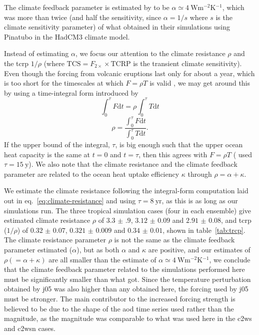 \documentclass{ametsocV6.1}
\begin{document}

The climate feedback parameter is estimated by \citet{jones2005} to be \(\alpha \simeq
\SI{4}{\watt\metre^{-2}\kelvin^{-1}}\), which was more than twice (and half the
sensitivity, since \(\alpha =1/s\) where \(s\) is the climate sensitivity parameter) of
what \citet{gregory2016} obtained in their simulations using Pinatubo in the HadCM3
climate model.

Instead of estimating \(\alpha \), we focus our attention to the climate resistance
\(\rho \) and the \gls{tcrp} \(1/\rho\) (where \(\mathrm{TCS}=F_{2\times}\times
\mathrm{TCRP}\) is the transient climate sensitivity). Even though the forcing from
volcanic eruptions last only for about a year, which is too short for the timescales at
which \(F=\rho T\) is valid \citep{gregory2016}, we may get around this by using a
time-integral form introduced by \citet{merlis2014}
\begin{equation}
  \int_0^{\tau}F \mathrm{d}t=\rho\int_{0}^{\tau}T \mathrm{d}t
\end{equation}
\begin{equation}
  \rho=\frac{\int_0^{\tau}F \mathrm{d}t}{\int_{0}^{\tau}T \mathrm{d}t}.
  \label{eq:climate-resistance}
\end{equation}
%
If the upper bound of the integral, \(\tau \), is big enough such that the upper ocean
heat capacity is the same at \(t=0\) and \(t=\tau \), then this agrees with \(F=\rho T\)
\citep{gregory2016} (\citet{merlis2014} used \(\tau =\SI{15}{\mathrm{y}}\)). We also
note that the climate resistance and the climate feedback parameter are related to the
ocean heat uptake efficiency \(\kappa \) through \(\rho =\alpha +\kappa \).

We estimate the climate resistance following the integral-form computation laid out in
eq.~\ref{eq:climate-resistance} and using \(\tau =\SI{8}{\mathrm{yr}}\), as this is as
long as our simulations run. The three tropical simulation cases (four in each ensemble)
give estimated climate resistance \(\rho \) of \(\num{3.3(9)}\), \(\num{3.12(9)}\) and
\(\num{2.91(8)}\), and \gls{tcrp} (\(1/\rho\)) of \(\num{0.32(7)}\), \(\num{0.321(9)}\)
and \(\num{0.34(1)}\), shown in table~\ref{tab:trcp}. The climate resistance parameter
\(\rho\) is not the same as the climate feedback parameter \citet{jones2005} estimated
(\(\alpha\)), but as both \(\alpha \) and \(\kappa \) are positive, and our estimates of
\(\rho (=\alpha +\kappa) \) are all smaller than the \citet{jones2005} estimate of
\(\alpha \simeq \SI{4}{\watt\metre^{-2}\kelvin^{-1}}\), we conclude that the climate
feedback parameter related to the simulations performed here must be significantly
smaller than what \citet{jones2005} got. Since the temperature perturbation obtained by
\gls{j05} was also higher than any obtained here, the forcing used by \gls{j05} must be
stronger. The main contributor to the increased forcing strength is believed to be due
to the shape of the \gls{aod} time series used rather than the magnitude, as the
magnitude was comparable to what was used here in the \gls{c2ws} and \gls{c2wsn} cases.
\end{document}

